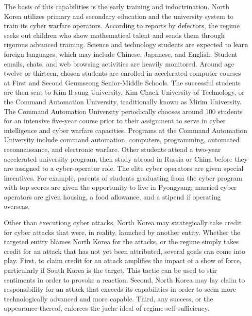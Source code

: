 \documentclass[12pt]{article}
\begin{document}
        The basis of this capabilities is the early training and indoctrination. North Korea utilizes primary and secondary education and the university system to train its cyber warfare operators. According to reports by defectors, the regime seeks out children who show mathematical talent and sends them through rigorous advanced training. Science and technology students are expected to learn foreign languages, which may include Chinese, Japanese, and English. Student emails, chats, and web browsing activities are heavily monitored. Around age twelve or thirteen, chosen students are enrolled in accelerated computer courses at First and Second Geumseong Senior-Middle Schools. The successful students are then sent to Kim Il-sung University, Kim Chaek University of Technology, or the Command Automation University, traditionally known as Mirim University. The Command Automation University periodically chooses around 100 students for an intensive five-year course prior to their assignment to serve in cyber intelligence and cyber warfare capacities. Programs at the Command Automation University include command automation, computers, programming, automated reconnaissance, and electronic warfare. Other students attend a two-year accelerated university program, then study abroad in Russia or China before they are assigned to a cyber-operator role. The elite cyber operators are given special incentives. For example, parents of students graduating from the cyber program with top scores are given the opportunity to live in Pyongyang; married cyber operators are given housing, a food allowance, and a stipend if operating overseas.
        
        Other than executiong cyber attacks, North Korea may strategically take credit for cyber attacks that were, in reality, launched by another entity. Whether the targeted entity blames North Korea for the attacks, or the regime simply takes credit for an attack that has not yet been attributed, several goals can come into play. First, to claim credit for an attack amplifies the impact of a show of force, particularly if South Korea is the target. This tactic can be used to stir sentiments in order to provoke a reaction. Second, North Korea may lay claim to responsibility for an attack that exceeds its capabilities in order to seem more technologically advanced and more capable. Third, any success, or the appearance thereof, enforces the juche ideal of regime self-sufficiency.\cite{LazarusConstellation}\cite{ProfilingEnigmaMystery}
        
 
        
\end{document}
